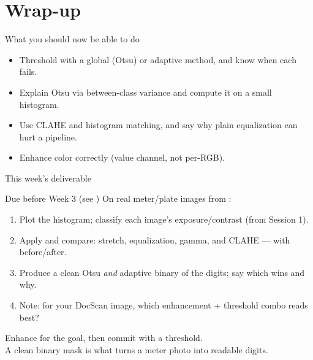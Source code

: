\documentclass[10pt,aspectratio=169]{beamer}
\begin{document}
\section{Wrap-up}

\begin{frame}{What you should now be able to do}
  \begin{itemize}
    \item Threshold with a global (Otsu) or adaptive method, and know when each fails.
    \item Explain Otsu via between-class variance and compute it on a small histogram.
    \item Use CLAHE and histogram matching, and say why plain equalization can hurt a pipeline.
    \item Enhance color correctly (value channel, not per-RGB).
  \end{itemize}
\end{frame}

\begin{frame}{This week's deliverable}
  \begin{alertblock}{Due before Week 3 (see )}
    On real meter/plate images from :
    \begin{enumerate}
      \item Plot the histogram; classify each image's exposure/contrast (from Session 1).
      \item Apply and compare: stretch, equalization, gamma, and CLAHE — with before/after.
      \item Produce a clean Otsu \emph{and} adaptive binary of the digits; say which wins and why.
      \item Note: for your DocScan image, which enhancement + threshold combo reads best?
    \end{enumerate}
  \end{alertblock}
\end{frame}

\begin{frame}[standout]
  Enhance for the goal, then commit with a threshold.\\[4pt]
  \normalsize A clean binary mask is what turns a meter photo into readable digits.
\end{frame}
\end{document}
